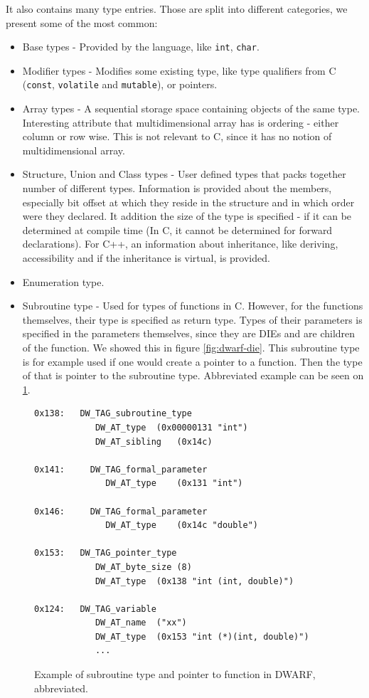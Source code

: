 It also contains many type entries.
Those are split into different categories, we present some of the most common:
\begin{itemize}
    \item Base types - Provided by the language, like \texttt{int}, \texttt{char}.
    \item Modifier types - Modifies some existing type, like type qualifiers
        from C (\texttt{const}, \texttt{volatile} and \texttt{mutable}), or
        pointers.
    \item Array types - A sequential storage space containing objects of the
        same type. Interesting attribute that multidimensional array has is
        ordering - either column or row wise. This is not relevant to C, since
        it has no notion of multidimensional array.
    \item Structure, Union and Class types - User defined types that packs
        together number of different types. Information is provided about the
        members, especially bit offset at which they reside in the structure
        and in which order were they declared. It addition the size of the type
        is specified - if it can be determined at compile time (In C, it cannot
        be determined for forward declarations). For C++, an information about
        inheritance, like deriving, accessibility and if the inheritance is
        virtual, is provided.
    \item Enumeration type.
    \item Subroutine type - Used for types of functions in C. However, for the
        functions themselves, their type is specified as return type. Types of
        their parameters is specified in the parameters themselves, since they
        are DIEs and are children of the function. We showed this in figure
        \ref{fig:dwarf-die}. This subroutine type is for example used if one
        would create a pointer to a function. Then the type of that is pointer
        to the subroutine type. Abbreviated example can be seen on
        \ref{fig:dwarf-ptr-to-fun}.
\end{itemize}

\begin{figure}
    \begin{lstlisting}
0x138:   DW_TAG_subroutine_type
            DW_AT_type	(0x00000131 "int")
            DW_AT_sibling	(0x14c)

0x141:     DW_TAG_formal_parameter
              DW_AT_type	(0x131 "int")

0x146:     DW_TAG_formal_parameter
              DW_AT_type	(0x14c "double")

0x153:   DW_TAG_pointer_type
            DW_AT_byte_size	(8)
            DW_AT_type	(0x138 "int (int, double)")

0x124:   DW_TAG_variable
            DW_AT_name	("xx")
            DW_AT_type	(0x153 "int (*)(int, double)")
            ...
    \end{lstlisting}
    \caption{Example of subroutine type and pointer to function in DWARF,
             abbreviated.}
    \label{fig:dwarf-ptr-to-fun}
\end{figure}


